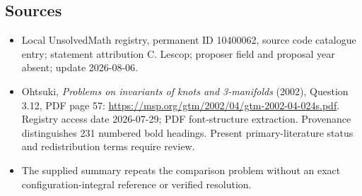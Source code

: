 \documentclass[11pt]{article}
\begin{document}
\subsection{Sources}
\begin{itemize}
\item Local UnsolvedMath registry, permanent ID 10400062, source code catalogue entry; statement attribution C. Lescop; proposer field and proposal year absent; update 2026-08-06.
\item Ohtsuki, \emph{Problems on invariants of knots and 3-manifolds} (2002), Question 3.12, PDF page 57: \url{https://msp.org/gtm/2002/04/gtm-2002-04-024s.pdf}. Registry access date 2026-07-29; PDF font-structure extraction. Provenance distinguishes 231 numbered bold headings. Present primary-literature status and redistribution terms require review.
\item The supplied summary repeats the comparison problem without an exact configuration-integral reference or verified resolution.
\end{itemize}
\end{document}
